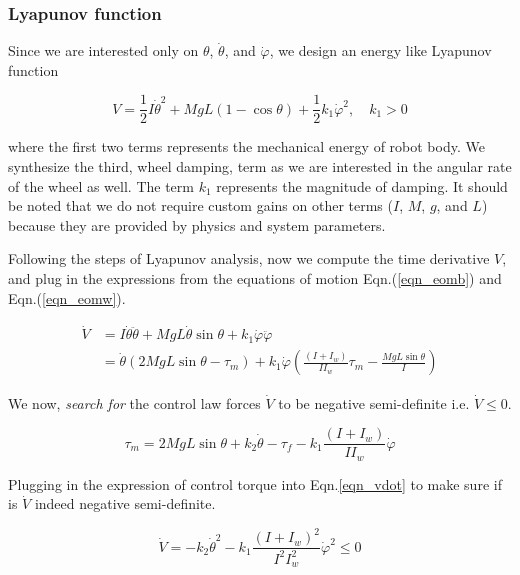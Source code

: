 \documentclass{article}
\begin{document}
\subsubsection*{Lyapunov function}

Since we are interested only on $\theta$,  $\dot{\theta}$, and $\dot{\varphi}$, we design an energy like Lyapunov function

\begin{equation}
  V = \frac{1}{2} I \dot{\theta}^2 + MgL (1 - \cos\theta) + \frac{1}{2} k_1 \dot{\varphi}^2, \quad k_1 > 0
\end{equation}

where the first two terms represents the mechanical energy of robot body. We synthesize the third, wheel damping, term as we are interested in the angular rate of the wheel as well. The term $k_{1}$ represents the magnitude of damping. It should be noted that we do not require custom gains on other terms ($I$, $M$, $g$, and $L$) because they are provided by physics and system parameters.

Following the steps of Lyapunov analysis, now we compute the time derivative $V$, and plug in the expressions from the equations of motion Eqn.(\ref{eqn_eomb}) and Eqn.(\ref{eqn_eomw}).

\begin{align}
  \dot{V} &= I \dot{\theta} \ddot{\theta} + MgL \dot{\theta} \sin\theta + k_1 \dot{\varphi} \ddot{\varphi} \nonumber \\
          &= \dot{\theta}(2MgL \sin\theta - \tau_m) + k_1 \dot{\varphi}\left(\frac{(I + I_w)}{I I_w}\tau_m - \frac{MgL \sin\theta}{I}\right)
  \label{eqn_vdot}
\end{align}

We now, \textit{search for} the control law forces $\dot{V}$ to be negative semi-definite i.e. $\dot{V}\leq0$.

\begin{equation}
  \tau_m = 2MgL \sin\theta + k_2 \dot{\theta} - \tau_{f}- k_1 \frac{(I + I_w)}{I I_w} \dot{\varphi}
  \label{eqn_ctrl}
\end{equation}

Plugging in the expression of control torque into Eqn.{\ref{eqn_vdot}} to make sure if is $\dot{V}$ indeed negative semi-definite.

\begin{equation}
  \dot{V} = -k_2 \dot{\theta}^2 - k_1 \frac{(I + I_w)^2}{I^2 I_w^2} \dot{\varphi}^2 \leq 0
\end{equation}
\end{document}
